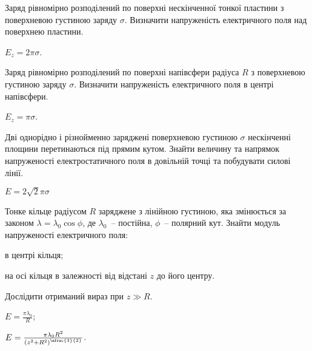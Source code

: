 \begin{problem}\label{prb:surface}
Заряд рівномірно розподілений по поверхні нескінченної тонкої пластини з поверхневою густиною заряду $\sigma$. Визначити напруженість електричного поля над поверхнею пластини.
\begin{solution}
	$E_z = 2\pi\sigma$.
\end{solution}
\end{problem}

\begin{problem}\label{hemisphere}
Заряд рівномірно розподілений по поверхні напівсфери радіуса $R$ з поверхневою густиною заряду $\sigma$. Визначити напруженість електричного поля в центрі напівсфери.
\begin{solution}
	$E_z = \pi\sigma$.
\end{solution}
\end{problem}

\begin{problem}
Дві однорідно і різнойменно заряджені поверхневою густиною $\sigma$ нескінченні площини перетинаються під прямим кутом. Знайти величину та напрямок напруженості електростатичного поля в довільній точці та побудувати силові лінії.
\begin{solution}
	$E=2\sqrt{2}\pi\sigma$
\end{solution}
\end{problem}

\begin{problem}
Тонке кільце радіусом $R$ заряджене з лінійною густиною, яка змінюється за законом $\lambda = \lambda_0\cos\phi$, де $\lambda_0$~-- постійна, $\phi$~-- полярний кут. Знайти модуль напруженості електричного
поля:
\begin{enumerate*}[label=\alph*)]
	\item в центрі кільця;
	\item на осі кільця в залежності від відстані $z$ до його
	центру.
\end{enumerate*}
Дослідити отриманий вираз при $z \gg R$.
\begin{solution}
	\begin{enumerate*}[label=\alph*)]
		\item $E = \frac{\pi\lambda_0}{R}$;
		\item $E = \frac{\pi\lambda_0R^2}{\left( z^2 + R^2\right)^{\nfrac{3}{2}}}$.
	\end{enumerate*}
\end{solution}
\end{problem}

